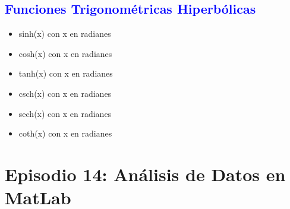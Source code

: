 \documentclass{article}
\begin{document}
	\subsection{\textcolor{blue}{Funciones Trigonométricas Hiperbólicas}}

	\begin{multicols}{2}
	\begin{itemize}
		\item sinh(x) con x en radianes
		\item cosh(x) con x en radianes
		\item tanh(x) con x en radianes
		\item csch(x) con x en radianes
		\item sech(x) con x en radianes
		\item coth(x) con x en radianes
	\end{itemize}
\end{multicols}

	\section{Episodio 14: Análisis de Datos en MatLab}
	
\end{document}
